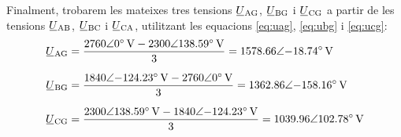 \begin{exemple}
    Finalment, trobarem les mateixes tres tensions $\cmplx{U}\ped{AG}$, $\cmplx{U}\ped{BG}$ i $\cmplx{U}\ped{CG}$ a partir de les tensions $\cmplx{U}\ped{AB}$, $\cmplx{U}\ped{BC}$ i $\cmplx{U}\ped{CA}$, utilitzant les equacions \eqref{eq:uag}, \eqref{eq:ubg} i \eqref{eq:ucg}:
    \begin{align*}
        \cmplx{U}\ped{AG} &= \frac{\complexqty{2760:0}{V}-\complexqty{2300:138,59}{V}}{3}
        = \complexqty{1578,66:-18,74}{V} \\[1.5ex]
        \cmplx{U}\ped{BG} &= \frac{\complexqty{1840:-124,23}{V}-\complexqty{2760:0}{V}}{3}  =
        \complexqty{1362,86:-158,16}{V}  \\[1.5ex]
        \cmplx{U}\ped{CG} &= \frac{\complexqty{2300:138,59}{V}-\complexqty{1840:-124,23}{V}}{3}  = \complexqty{1039,96:102,78}{V}
    \end{align*}
\end{exemple}


